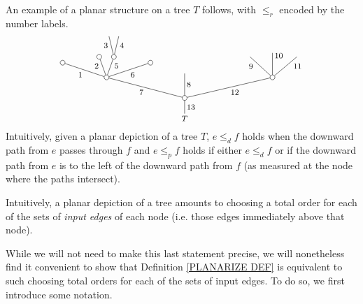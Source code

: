 \documentclass[a4paper,10pt]{article}%
\begin{document}
\begin{example}
An example of a planar structure on a tree $T$ follows, with $\leq_r$ encoded by the number labels.
\begin{equation}\label{PLANAREX EQ}
	\begin{tikzpicture}[grow=up,auto,level distance=2.1em,
	every node/.style = {font=\footnotesize,inner sep=2pt},
	dummy/.style={circle,draw,inner sep=0pt,minimum size=1.75mm}]
		\node at (0,0) {$T$}
			child{node [dummy] {}
				child[sibling distance = 9em]{node [dummy] {}
					child[sibling distance = 2.5em]{
					edge from parent node [near end,swap] {$11$}}
					child[level distance=2.5em]{
					edge from parent node [very near end,swap] {$10$}}				
					child[sibling distance = 2.3em]{
					edge from parent node [near end] {$9$}}
				edge from parent node [swap] {12}}
				child[level distance =2.5em]{
				edge from parent node [swap] {$8$}}
				child[sibling distance = 8em]{node [dummy] {}
					child[sibling distance =3em, level distance = 1.5 em]{node [dummy] {}
					edge from parent node [swap] {$6$}}
					child[sibling distance = 1.5em]{node [dummy] {}
						child[sibling distance =1em]{
						edge from parent node [swap,near end] {$4$}}
						child[sibling distance =1em]{
						edge from parent node [near end] {$3$}}
					edge from parent node [very near end,swap] {$5$}}
					child[sibling distance =1.5em]{node [dummy] {}
					edge from parent node [very near end] {$2$}}
					child[sibling distance =3em,level distance =1.5em]{node [dummy] {}
					edge from parent node {$1$}}
				edge from parent node {$7$}}
			edge from parent node [swap] {$13$}};
	\end{tikzpicture}
\end{equation}
Intuitively, given a planar depiction of a tree $T$, $e \leq_d f$ holds when the downward path from $e$ passes through $f$
and $e \leq_p f$ holds if either
$e \leq_d f$ or if the downward path from $e$ is to the left of the downward path from $f$ (as measured at the node where the paths intersect).
\end{example}



Intuitively, a planar depiction of a tree amounts to choosing a total order for each of the sets of \textit{input edges} of each node (i.e. those edges immediately above that node).

While we will not need to make this last statement precise, we will nonetheless find it convenient to show that Definition \ref{PLANARIZE DEF} is equivalent to such choosing total orders for each of the sets of input edges.
To do so, we first introduce some notation.
\end{document}
